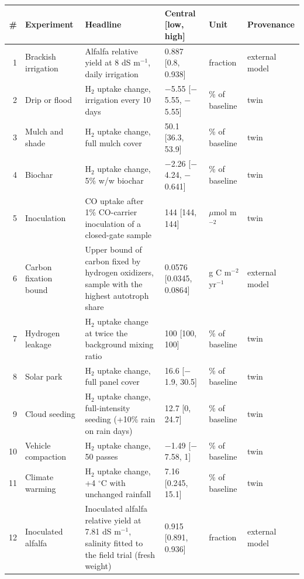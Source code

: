 \begin{tabular}{@{}rp{2.3cm}p{5.0cm}p{3.1cm}p{2.1cm}p{1.8cm}@{}}
\toprule
\# & Experiment & Headline & Central [low, high] & Unit & Provenance \\
\midrule
1 & Brackish irrigation & Alfalfa relative yield at 8 dS m$^{-1}$, daily irrigation & 0.887 [0.8, 0.938] & fraction & external model \\
2 & Drip or flood & H$_2$ uptake change, irrigation every 10 days & $-$5.55 [$-$5.55, $-$5.55] & \% of baseline & twin \\
3 & Mulch and shade & H$_2$ uptake change, full mulch cover & 50.1 [36.3, 53.9] & \% of baseline & twin \\
4 & Biochar & H$_2$ uptake change, 5\% w/w biochar & $-$2.26 [$-$4.24, $-$0.641] & \% of baseline & twin \\
5 & Inoculation & CO uptake after 1\% CO-carrier inoculation of a closed-gate sample & 144 [144, 144] & $\mu$mol m$^{-2}$ & twin \\
6 & Carbon fixation bound & Upper bound of carbon fixed by hydrogen oxidizers, sample with the highest autotroph share & 0.0576 [0.0345, 0.0864] & g C m$^{-2}$ yr$^{-1}$ & external model \\
7 & Hydrogen leakage & H$_2$ uptake change at twice the background mixing ratio & 100 [100, 100] & \% of baseline & twin \\
8 & Solar park & H$_2$ uptake change, full panel cover & 16.6 [$-$1.9, 30.5] & \% of baseline & twin \\
9 & Cloud seeding & H$_2$ uptake change, full-intensity seeding (+10\% rain on rain days) & 12.7 [0, 24.7] & \% of baseline & twin \\
10 & Vehicle compaction & H$_2$ uptake change, 50 passes & $-$1.49 [$-$7.58, 1] & \% of baseline & twin \\
11 & Climate warming & H$_2$ uptake change, +4 $^\circ$C with unchanged rainfall & 7.16 [0.245, 15.1] & \% of baseline & twin \\
12 & Inoculated alfalfa & Inoculated alfalfa relative yield at 7.81 dS m$^{-1}$, salinity fitted to the field trial (fresh weight) & 0.915 [0.891, 0.936] & fraction & external model \\
\bottomrule
\end{tabular}
